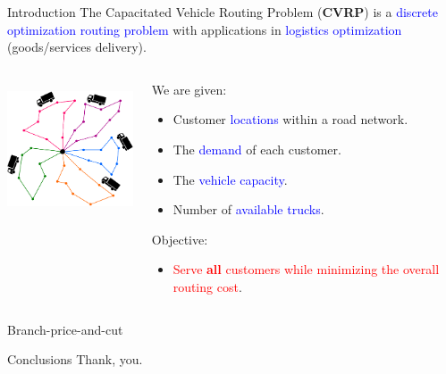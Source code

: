 \begin{frame}
	\maketitle
\end{frame}

\begin{frame}{Introduction}
	The Capacitated Vehicle Routing Problem (\textbf{CVRP}) is a \textcolor{blue}{discrete optimization routing problem} with applications in \textcolor{blue}{logistics optimization} (goods/services delivery).

	\vspace{0.5cm}

	\begin{columns}
		\begin{column}{.35\textwidth}
			\centering
			\includegraphics[height=4cm]{Imgs/CVRP-example.cropped.pdf}
		\end{column}
		\begin{column}{.65\textwidth}
			We are given:
			\begin{itemize}
				\item Customer \textcolor{blue}{locations} within a road network.
				\item The \textcolor{blue}{demand} of each customer.
				\item The \textcolor{blue}{vehicle capacity}.
				\item Number of \textcolor{blue}{available trucks}.
			\end{itemize}
			Objective:
			\begin{itemize}
				\item \textcolor{red}{Serve \textbf{all} customers while minimizing the overall routing cost}.
			\end{itemize}
		\end{column}
	\end{columns}

\end{frame}

\begin{frame}{Branch-price-and-cut}
\end{frame}

\begin{frame}{Conclusions}
	Thank, you.

	\cite{jepsen2014}
\end{frame}

\begin{frame}
	\maketitle
\end{frame}

